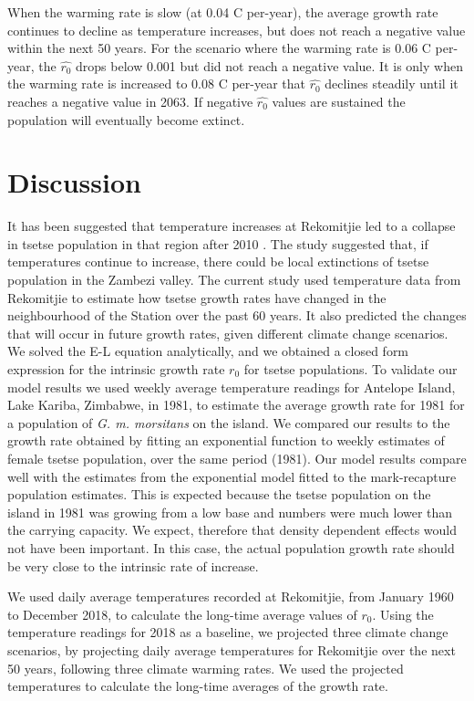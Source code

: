 \documentclass[12pt,a4paper]{article}
\begin{document}
When the warming rate is slow (at 0.04 \textdegree C per-year), the average growth rate continues to decline as temperature increases, but does not reach a negative value within the next 50 years. For the scenario where the warming rate is 0.06 \textdegree C per-year, the $\hat{r_0}$ drops below 0.001 but did not reach a negative value. It is only when the warming rate is increased to 0.08 \textdegree C per-year that $\hat{r_0}$ declines steadily until it reaches a negative value in 2063. If negative $\hat{r_0}$ values are sustained the population will eventually become extinct.

 
\section*{Discussion}
It has been suggested that temperature increases at Rekomitjie led to a collapse in tsetse population in that region after 2010 \cite{Lord2018}. The study suggested that, if temperatures continue to increase, there could be local extinctions of tsetse population in the Zambezi valley.  The current study used temperature data from Rekomitjie to estimate how tsetse growth rates have changed in the neighbourhood of the Station over the past 60 years. It also predicted the changes that will occur in future growth rates, given different climate change scenarios.  We solved the E-L equation analytically, and we obtained a closed form expression for the intrinsic growth rate $r_0$ for tsetse populations. To validate our model results we used weekly average temperature readings for Antelope Island, Lake Kariba, Zimbabwe, in 1981, to estimate the average growth rate for 1981 for a population of \textit{G. m. morsitans} on the island. We compared our results to the growth rate obtained by fitting an exponential function to weekly estimates of female tsetse population, over the same period (1981). Our model results compare well with the estimates from the exponential model fitted to the mark-recapture population estimates. This is expected because the tsetse population on the island in 1981 was growing from a low base and numbers were much lower than the carrying capacity. We expect, therefore that density dependent effects would not have been important. In this case, the actual population growth rate should be very close to the intrinsic rate of increase.

We used daily average temperatures recorded at Rekomitjie, from January 1960 to December 2018, to calculate the long-time average values of $r_0$. Using the temperature readings for 2018 as a baseline, we projected three climate change scenarios, by projecting daily average temperatures for Rekomitjie over the next 50 years, following three climate warming rates. We used the projected temperatures to calculate the long-time averages of the growth rate. 
\end{document}
